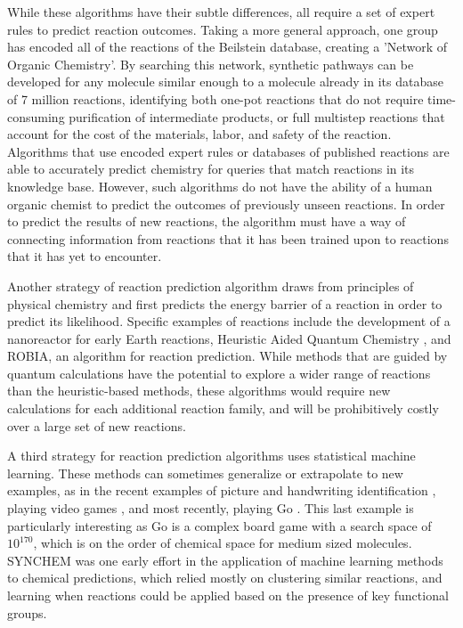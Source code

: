 While these algorithms have their subtle differences, all require a set of expert rules to predict reaction outcomes. Taking a more general approach, one group has encoded all of the reactions of the Beilstein database, creating a 'Network of Organic Chemistry'\cite{Gothard_2012,Szymkuc_2016}. By searching this network, synthetic pathways can be developed for any molecule similar enough to a molecule already in its database of 7 million reactions, identifying both one-pot reactions that do not require time-consuming purification of intermediate products\cite{Grzybowski_2009}, or full multistep reactions that account for the cost of the materials, labor, and safety of the reaction\cite{Szymkuc_2016}. Algorithms that use encoded expert rules or databases of published reactions are able to accurately predict chemistry for queries that match reactions in its knowledge base. However, such algorithms do not have the ability of a human organic chemist to predict the outcomes of previously unseen reactions. In order to predict the results of new reactions, the algorithm must have a way of connecting information from reactions that it has been trained upon to reactions that it has yet to encounter.

Another strategy of reaction prediction algorithm draws from principles of physical chemistry and first predicts the energy barrier of a reaction in order to predict its likelihood\cite{Zimmerman_2013,Wang_2014,Wang_2016,xu2009dynamics,Rappoport_2014,Socorro_2005}. Specific examples of reactions include the development of a nanoreactor for early Earth reactions\cite{Wang_2014,Wang_2016}, Heuristic Aided Quantum Chemistry \cite{Rappoport_2014}, and ROBIA\cite{socorro2005robia}, an algorithm for reaction prediction. While methods that are guided by quantum calculations have the potential to explore a wider range of reactions than the heuristic-based methods, these algorithms would require new calculations for each additional reaction family, and will be prohibitively costly over a large set of new reactions.

A third strategy for reaction prediction algorithms uses statistical machine learning. These methods can sometimes generalize or extrapolate to new examples, as in the recent examples of picture and handwriting identification \cite{He_2015,krizhevsky2012imagenet}, playing video games \cite{mnih2015human}, and most recently, playing Go \cite{silver2016mastering}. This last example is particularly interesting as Go is a complex board game with a search space of $10^{170}$, which is on the order of chemical space for medium sized molecules\cite{reymond2010chemical}.  SYNCHEM was one early effort in the application of machine learning methods to chemical predictions, which relied mostly on clustering similar reactions, and learning when reactions could be applied based on the presence of key functional groups\cite{Gelernter_1990}. 

